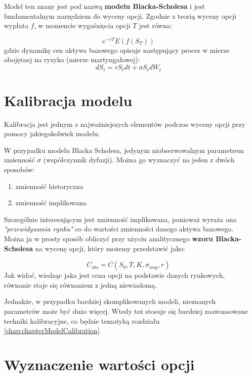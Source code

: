 \documentclass{pracamgr}
\begin{document}
Model ten znany jest pod nazwą \textbf{modelu Blacka-Scholesa} i jest fundamentalnym narzędziem do wyceny opcji.
Zgodnie z teorią wyceny opcji wypłata $f$, w momencie wygaśnięcia opcji $T$ jest równa:

\begin{equation}
  e^{-rT} E(f(S_T))
\end{equation}
gdzie dynamikę cen aktywa bazowego opisuje następujący proces w mierze obojętnej na ryzyko (mierze martyngałowej):
\begin{equation}
   
  dS_t = r S_t dt + \sigma S_t d W_t 
\end{equation}


\section{Kalibracja modelu}
Kalibracja jest jednym z najważniejszych elementów podczas wyceny opcji przy pomocy jakiegokolwiek
modelu.  

W przypadku modelu Blacka Scholesa, jedynym niobserwowalnym parametrem zmienność $\sigma$ (współczynnik dyfuzji).
Można go wyznaczyć na jeden z dwóch sposobów:
\begin{enumerate}
  \item zmienność historyczna
  \item zmienność implikowana
\end{enumerate}

Szczególnie interesującym jest zmienność implikowana, ponieważ wyraża ona \textit{"przewidywania rynku"} co 
do wartości zmienności danego aktywa bazowego. 
Można ja w prosty sposób obliczyć przy użyciu analitycznego \textbf{wzoru Blacka-Scholesa} na wycenę opcji, który 
możemy przedstawić jako:

\begin{equation}
  C_{obs} = C(S_0, T, K, \sigma_{imp}, r)
\end{equation}
Jak widać, wiedząc jaka jest cena opcji na podstawie danych rynkowych, równanie staje się równaniem z jedną niewiadomą. 

Jednakże, w przypadku bardziej skomplikowanych modeli, nieznanych parametrów może być dużo więcej. Wtedy też 
stosuje się bardziej zaawansowane techniki kalibracyjne, co będzie tematyką rozdziału \ref{chap:chapterModelCalibration}.


\section{Wyznaczenie wartości opcji}
\end{document}
